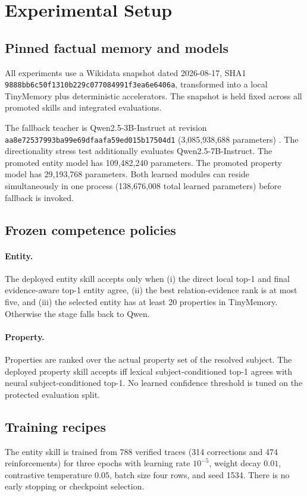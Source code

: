 \documentclass[10pt]{article}
\begin{document}
\section{Experimental Setup}

\subsection{Pinned factual memory and models}
All experiments use a Wikidata snapshot dated 2026-08-17, SHA1
\texttt{9888bb6c50f1310b229c077084991f3ea6e6406a}, transformed into a local TinyMemory plus deterministic accelerators. The snapshot is held fixed across all promoted skills and integrated evaluations.

The fallback teacher is Qwen2.5-3B-Instruct at revision
\texttt{\small aa8e72537993ba99e69dfaafa59ed015\allowbreak b17504d1}
(3,085,938,688 parameters) \cite{qwen2024qwen25}. The directionality stress test additionally evaluates Qwen2.5-7B-Instruct. The promoted entity model has 109,482,240 parameters. The promoted property model has 29,193,768 parameters. Both learned modules can reside simultaneously in one process (138,676,008 total learned parameters) before fallback is invoked.

\subsection{Frozen competence policies}
\paragraph{Entity.}
The deployed entity skill accepts only when (i) the direct local top-1 and final evidence-aware top-1 entity agree, (ii) the best relation-evidence rank is at most five, and (iii) the selected entity has at least 20 properties in TinyMemory. Otherwise the stage falls back to Qwen.

\paragraph{Property.}
Properties are ranked over the actual property set of the resolved subject. The deployed property skill accepts iff lexical subject-conditioned top-1 agrees with neural subject-conditioned top-1. No learned confidence threshold is tuned on the protected evaluation split.

\subsection{Training recipes}
The entity skill is trained from 788 verified traces (314 corrections and 474 reinforcements) for three epochs with learning rate $10^{-5}$, weight decay $0.01$, contrastive temperature $0.05$, batch size four rows, and seed 1534. There is no early stopping or checkpoint selection.
\end{document}
